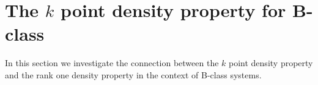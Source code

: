 \documentclass[12pt,oneside,a4paper]{amsart}
\begin{document}



    \section{The \texorpdfstring{$k$}{k} point density property for B-class}
      \label{sec:kpd}
      In this section we investigate the connection between the $k$ point density property and
        the rank one density property in the context of B-class systems.
\end{document}
